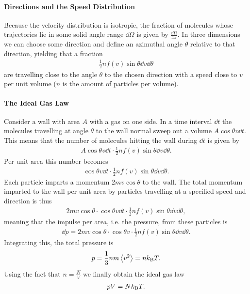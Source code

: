 \paragraph{Directions and the Speed Distribution}
Because the velocity distribution is isotropic, the fraction of molecules whose trajectories lie in some solid angle range $\dd{\Omega}$ is given by $\frac{\dd{\Omega}}{4\pi}$. In three dimensions we can choose some direction and define an azimuthal angle $\theta$ relative to that direction, yielding that a fraction
\begin{align*}
	\frac{1}{2}nf(v)\sin{\theta}\dd{v}\dd{\theta}
\end{align*}
are travelling close to the angle $\theta$ to the chosen direction with a speed close to $v$ per unit volume ($n$ is the amount of particles per volume).

\paragraph{The Ideal Gas Law}
Consider a wall with area $A$ with a gas on one side. In a time interval $\dd{t}$ the molecules travelling at angle $\theta$ to the wall normal sweep out a volume $A\cos{\theta}v\dd{t}$. This means that the number of molecules hitting the wall during $\dd{t}$ is given by
\begin{align*}
	A\cos{\theta}v\dd{t}\cdot\frac{1}{2}nf(v)\sin{\theta}\dd{v}\dd{\theta}.
\end{align*}
Per unit area this number becomes
\begin{align*}
	\cos{\theta}v\dd{t}\cdot\frac{1}{2}nf(v)\sin{\theta}\dd{v}\dd{\theta}.
\end{align*}
Each particle imparts a momentum $2mv\cos{\theta}$ to the wall. The total momentum imparted to the wall per unit area by particles travelling at a specified speed and direction is thus
\begin{align*}
	2mv\cos{\theta}\cdot\cos{\theta}v\dd{t}\cdot\frac{1}{2}nf(v)\sin{\theta}\dd{v}\dd{\theta},
\end{align*}
meaning that the impulse per area, i.e. the pressure, from these particles is
\begin{align*}
	\dd{p} = 2mv\cos{\theta}\cdot\cos{\theta}v\cdot\frac{1}{2}nf(v)\sin{\theta}\dd{v}\dd{\theta}.
\end{align*}
Integrating this, the total pressure is
\begin{align*}
	p = \frac{1}{3}nm\expval{v^{2}} = nk_{\text{B}} T.
\end{align*}
Using the fact that $n = \frac{N}{V}$ we finally obtain the ideal gas law
\begin{align*}
	pV = Nk_{\text{B}} T.
\end{align*}

